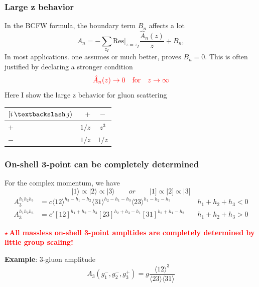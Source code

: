 \documentclass{beamer}
\newcommand{\aket}[1]{|#1\rangle}
\newcommand{\sket}[1]{|#1]}
\newcommand{\avg}[1]{\langle #1 \rangle}
\begin{document}
\begin{frame}
    \frametitle{Large z behavior}
    In the BCFW formula, the boundary term $B_n$ affects a lot
    \begin{equation*}
        A_n=-\sum_{z_I}\mathrm{Res}|_{z=z_I}\frac{\hat{A}_n(z)}{z}+B_n,
    \end{equation*}
    In most applications. one assumes or much better, proves $B_n=0$. This is often justified by declaring a stronger condition
    \begin{equation*}
        \textcolor{red}{\hat{A}_n(z)\rightarrow 0 \quad \text{for} \quad z\rightarrow \infty} 
    \end{equation*}
    Here I show the large z behavior for gluon scattering 
    \begin{center}
        \begin{tabular}{lrc}
            \toprule
            $[i\, \textbackslash \, j\rangle $ & $+$ & $-$ \\
            \midrule
            $+$ & $1/z$ & $z^3$ \\
            $-$ & $1/z$ & $1/z$ \\
            \bottomrule
          \end{tabular}
    \end{center}
\end{frame}

\begin{frame}
    \frametitle{ On-shell 3-point can be completely determined}
    For the complex momentum, we have 
    \begin{equation*}
        \aket{1}\propto \aket{2}\propto \aket{3} \qquad or \qquad \sket{1}\propto \sket{2}\propto \sket{3}
    \end{equation*}
    \[
    \boxed{
    \begin{aligned}
        A_3^{h_1h_2h_3} &= c\avg{12}^{h_3-h_1-h_2}\avg{31}^{h_2-h_1-h_3}\avg{23}^{h_1-h_2-h_3}
        \quad & h_1+h_2+h_3 < 0 \\[0.5em]
        A_3^{h_1h_2h_3} &= c' [12]^{h_1+h_2-h_3}[23]^{h_2+h_3-h_1}[31]^{h_3+h_1-h_2}
        \quad & h_1+h_2+h_3 > 0
    \end{aligned}
        }
    \]

    \textbf{\textcolor{red}{$\star$\,All massless on-shell 3-point ampltides are completely determined by little group scaling!}}
    
    \textbf{Example}: 3-gluon amplitude\\
    \begin{equation*}
        A_3(g_1^-,g_2^-,g_3^+)=g\frac{\avg{12}^3}{\avg{23}\!\avg{31}}
    \end{equation*}
\end{frame}
\end{document}
